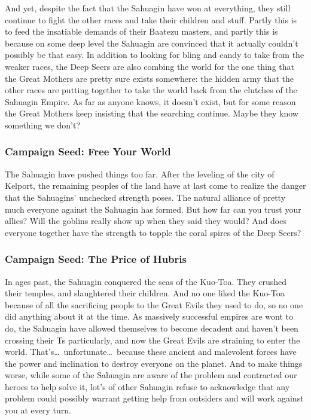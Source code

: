 And yet, despite the fact that the Sahuagin have won at everything, they still continue to fight the other races and take their children and stuff. Partly this is to feed the insatiable demands of their Baatezu masters, and partly this is because on some deep level the Sahuagin are convinced that it actually couldn't possibly be that easy. In addition to looking for bling and candy to take from the weaker races, the Deep Seers are also combing the world for the one thing that the Great Mothers are pretty sure exists somewhere: the hidden army that the other races are putting together to take the world back from the clutches of the Sahuagin Empire. As far as anyone knows, it doesn't exist, but for some reason the Great Mothers keep insisting that the searching continue. Maybe they know something we don't?

\subsubsection{Campaign Seed: Free Your World}
The Sahuagin have pushed things too far. After the leveling of the city of Kelport, the remaining peoples of the land have at last come to realize the danger that the Sahuagins' unchecked strength poses. The natural alliance of pretty much everyone against the Sahuagin has formed. But how far can you trust your allies? Will the goblins really show up when they said they would? And does everyone together have the strength to topple the coral spires of the Deep Seers?

\subsubsection{Campaign Seed: The Price of Hubris}
In ages past, the Sahuagin conquered the seas of the Kuo-Toa. They crushed their temples, and slaughtered their children. And no one liked the Kuo-Toa because of all the sacrificing people to the Great Evils they used to do, so no one did anything about it at the time. As massively successful empires are wont to do, the Sahuagin have allowed themselves to become decadent and haven't been crossing their Ts particularly, and now the Great Evils are straining to enter the world. That's\ldots\  unfortunate\ldots\  because these ancient and malevolent forces have the power and inclination to destroy everyone on the planet. And to make things worse, while some of the Sahuagin are aware of the problem and contracted our heroes to help solve it, lot's of other Sahuagin refuse to acknowledge that any problem could possibly warrant getting help from outsiders and will work against you at every turn.

